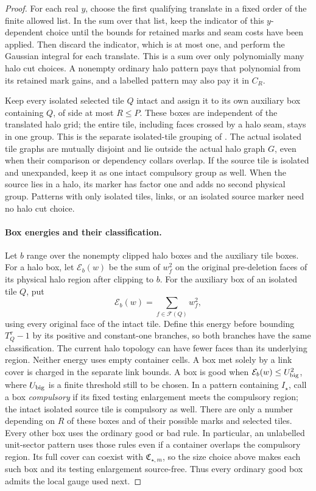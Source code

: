 \begin{proof}
For each real \(y\), choose the first qualifying translate in a
fixed order of the finite allowed list.  In the sum over that list,
keep the indicator of this \(y\)-dependent choice until the bounds
for retained marks and seam costs have been applied.  Then discard the
indicator, which is at most one, and perform the Gaussian integral
for each translate.  This is a sum over only polynomially many
halo cut choices.  A nonempty ordinary halo pattern pays that
polynomial from its retained mark gains, and a labelled pattern may
also pay it in \(C_R\).

Keep every isolated selected tile \(Q\) intact and assign it to its
own auxiliary box containing \(Q\), of side at most \(R\le P\).
These boxes are independent of the translated halo grid; the entire
tile, including faces crossed by a halo seam, stays in one group.
This is the separate isolated-tile grouping of \cite[Section~9]{B}.
The actual isolated tile graphs are mutually disjoint and lie outside
the actual halo graph \(G\), even when their comparison or dependency
collars overlap.  If the source tile is isolated and unexpanded, keep
it as one intact compulsory group as well.  When the source lies in a
halo, its marker has factor one and adds no second physical group.
Patterns with only isolated tiles, links, or an isolated source marker
need no halo cut choice.

\paragraph{Box energies and their classification.}
Let \(b\) range over the nonempty clipped halo boxes and the auxiliary
tile boxes.  For a halo box, let \(\mathcal E_b(w)\) be the sum of
\(w_f^2\) on the original pre-deletion faces of its physical halo
region after clipping to \(b\).  For the auxiliary box of an isolated
tile \(Q\), put
\[
                  \mathcal E_b(w)=\sum_{f\in\mathcal F(Q)}w_f^2,
\]
using every original face of the intact tile.  Define this energy
before bounding \(T_Q^\tau-1\) by its positive and constant-one
branches, so both branches have the same classification.  The current
halo topology can have fewer faces than its underlying region.
Neither energy uses empty container cells.  A box met solely by a
link cover is charged in the separate link bounds.  A box is good when
\(\mathcal E_b(w)\le U_{\rm big}^2\), where \(U_{\rm big}\)
is a finite threshold still to be chosen.  In a pattern containing
\(I_\star\), call a box \emph{compulsory} if its fixed testing
enlargement meets the compulsory region; the intact isolated source
tile is compulsory as well.  There are only a number depending on
\(R\) of these boxes and of their possible marks and selected tiles.
Every other box uses the ordinary good or bad rule.  In particular,
an unlabelled unit-sector pattern uses those rules even if a container
overlaps the compulsory region.  Its full cover can coexist with
\(\mathfrak C_{\star,m}\), so the size choice above makes each such
box and its testing enlargement source-free.  Thus every ordinary
good box admits the local gauge used next.


\end{proof}
